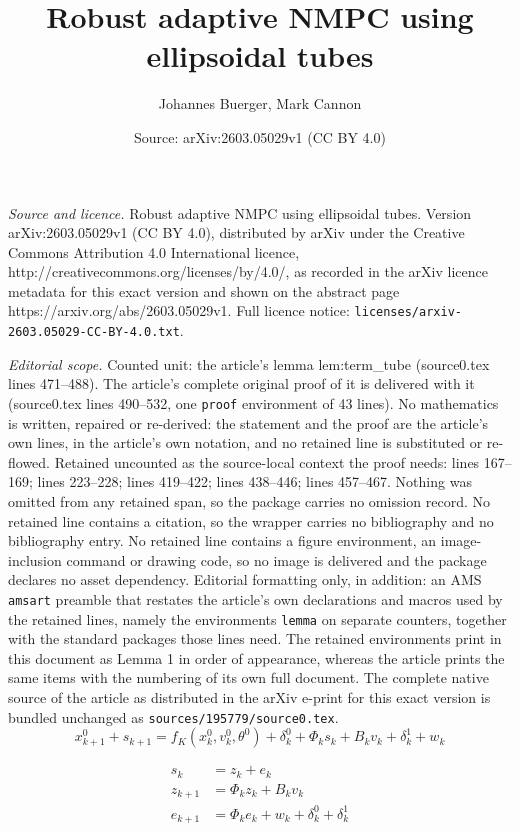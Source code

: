 \documentclass[10pt,a4paper]{amsart}
\title{Robust adaptive NMPC using ellipsoidal tubes}
\author{Johannes Buerger, Mark Cannon}
\date{Source: arXiv:2603.05029v1 (CC BY 4.0)}
\begin{document}
\maketitle

\noindent\emph{Source and licence.} Robust adaptive NMPC using ellipsoidal tubes. Version arXiv:2603.05029v1 (CC BY 4.0), distributed by arXiv under the Creative Commons Attribution 4.0 International licence, http://creativecommons.org/licenses/by/4.0/, as recorded in the arXiv licence metadata for this exact version and shown on the abstract page https://arxiv.org/abs/2603.05029v1. Full licence notice: \texttt{licenses/arxiv-2603.05029-CC-BY-4.0.txt}.\par\smallskip

\noindent\textit{Editorial scope.} Counted unit: the article's lemma lem:term\_tube (source0.tex lines 471--488). The article's complete original proof of it is delivered with it (source0.tex lines 490--532, one \texttt{proof} environment of 43 lines). No mathematics is written, repaired or re-derived: the statement and the proof are the article's own lines, in the article's own notation, and no retained line is substituted or re-flowed.  Retained uncounted as the source-local context the proof needs: lines 167--169; lines 223--228; lines 419--422; lines 438--446; lines 457--467.  Nothing was omitted from any retained span, so the package carries no omission record.  No retained line contains a citation, so the wrapper carries no bibliography and no bibliography entry.  No retained line contains a figure environment, an image-inclusion command or drawing code, so no image is delivered and the package declares no asset dependency.  Editorial formatting only, in addition: an AMS \texttt{amsart} preamble that restates the article's own declarations and macros used by the retained lines, namely the environments \texttt{lemma} on separate counters, together with the standard packages those lines need.  The retained environments print in this document as Lemma 1 in order of appearance, whereas the article prints the same items with the numbering of its own full document.  The complete native source of the article as distributed in the arXiv e-print for this exact version is bundled unchanged as \texttt{sources/195779/source0.tex}.
\begin{equation}\label{eq:taylor}
x^0_{k+1}+s_{k+1} =  f_K(x^0_k,v^0_k,\theta^0) + \delta^0_k + \Phi_k s_k + B_k v_k + \delta^1_k + w_k
\end{equation}

\begin{align}
s_k &= z_k + e_k \label{eq:decomp} \\
z_{k+1} &= \Phi_k z_k + B_kv_k \label{eq:z_dynamics}\\
e_{k+1} &= \Phi_k e_k + w_k + \delta^0_k + \delta^1_k
\label{eq:e_dynamics}
\end{align} 
\end{document}
